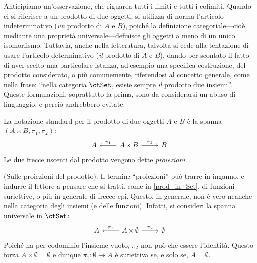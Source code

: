\begin{remark}
	Anticipiamo un'osservazione, che riguarda tutti i limiti e tutti i colimiti. Quando ci si riferisce a un prodotto di due oggetti, si utilizza di norma l'articolo indeterminativo (\emph{un} prodotto di \(A\) e \(B\)), poiché la definizione categoriale---cioè mediante una proprietà universale---definisce gli oggetti a meno di un unico isomorfismo. Tuttavia, anche nella letteratura, talvolta si cede alla tentazione di usare l'articolo determinativo (\emph{il} prodotto di \(A\) e \(B\)), dando per scontato il fatto di aver scelto una particolare istanza, ad esempio una specifica costruzione, del prodotto considerato, o più comunemente, riferendosi al concetto generale, come nella frase: ``nella categoria \(\ctSet\), esiste sempre \emph{il} prodotto due insiemi''.  Queste formulazioni, soprattutto la prima, sono da considerarsi un abuso di linguaggio, e perciò andrebbero evitate.
\end{remark}
\begin{notation} La notazione standard per il prodotto di due oggetti \(A\) e  \(B\) è la spanna \((A\times B,\pi_1,\pi_2)\):
	\[
		\begin{tikzcd}
			A&A\times B\ar[l, "\pi_1"']\ar[r, "\pi_2"]&B
		\end{tikzcd}
	\]
	Le due frecce uscenti dal prodotto vengono dette \emph{proiezioni}.
\end{notation}


\begin{remark}(Sulle proiezioni del prodotto).
	Il termine ``proiezioni'' può trarre in inganno, e indurre il lettore a pensare che si tratti, come in \ref{prod_in_Set}, di funzioni suriettive, o più in generale di frecce epi. Questo, in generale, non è vero neanche nella categoria degli insiemi (e delle funzioni). Infatti, si consideri la spanna universale in  \(\ctSet\):
	\[
		\begin{tikzcd}
			A&A\times \emptyset\ar[l, "\pi_1"']\ar[r, "\pi_2"]&\emptyset
		\end{tikzcd}
	\]
	Poiché ha per codominio l'insieme vuoto, \(\pi_2\) non può che essere l'identità. Questo forza \(A\times \emptyset=\emptyset\) e dunque \(\pi_1\colon \emptyset\to A\) è suriettiva se, e solo se, \(A=\emptyset\).
\end{remark}

